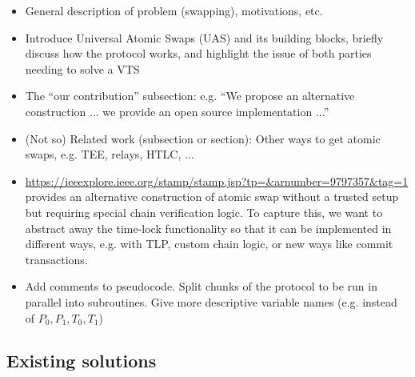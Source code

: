 \documentclass{article}      	%
\begin{document}
\begin{itemize}
    \item General description of problem (swapping), motivations, etc.
    \item Introduce Universal Atomic Swaps (UAS) and its building blocks, briefly discuss how the protocol works, and highlight the issue of both parties needing to solve a VTS
    \item The ``our contribution'' subsection: e.g. ``We propose an alternative construction ... we provide an open source implementation ...''
    \item (Not so) Related work (subsection or section): Other ways to get atomic swaps, e.g. TEE, relays, HTLC, ...
    \item \url{https://ieeexplore.ieee.org/stamp/stamp.jsp?tp=&arnumber=9797357&tag=1} provides an alternative construction of atomic swap without a trusted setup but requiring special chain verification logic. To capture this, we want to abstract away the time-lock functionality so that it can be implemented in different ways, e.g. with TLP, custom chain logic, or new ways like commit transactions.
    \item Add comments to pseudocode. Split chunks of the protocol to be run in parallel into subroutines. Give more descriptive variable names (e.g. instead of $P_0, P_1, T_0, T_1$)
\end{itemize}


\subsection{Existing solutions}

\end{document}
